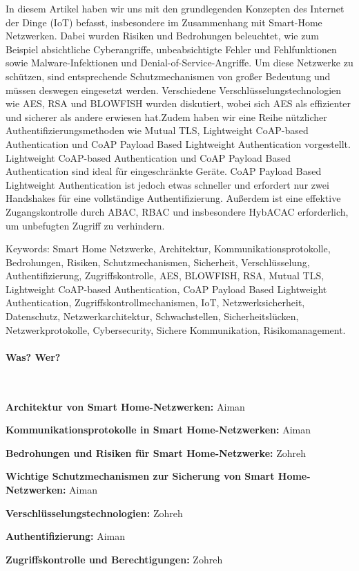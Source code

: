 In diesem Artikel haben wir uns mit den  grundlegenden Konzepten des Internet der Dinge (IoT) befasst, insbesondere im Zusammenhang mit Smart-Home Netzwerken.  Dabei wurden  Risiken und Bedrohungen beleuchtet, wie zum Beispiel absichtliche Cyberangriffe, unbeabsichtigte Fehler und Fehlfunktionen sowie Malware-Infektionen und Denial-of-Service-Angriffe. Um diese Netzwerke zu schützen, sind entsprechende  Schutzmechanismen von großer Bedeutung und müssen deswegen eingesetzt werden. Verschiedene Verschlüsselungstechnologien wie AES, RSA und BLOWFISH wurden diskutiert, wobei sich AES als effizienter und sicherer als andere erwiesen hat.Zudem haben wir eine Reihe nützlicher Authentifizierungsmethoden wie Mutual TLS, Lightweight CoAP-based Authentication und CoAP Payload Based Lightweight Authentication vorgestellt.  Lightweight CoAP-based Authentication und CoAP Payload Based Authentication sind ideal für eingeschränkte Geräte. CoAP Payload Based Lightweight Authentication ist jedoch etwas schneller und erfordert nur zwei Handshakes für eine vollständige Authentifizierung. Außerdem ist eine effektive Zugangskontrolle durch ABAC, RBAC und insbesondere HybACAC erforderlich, um unbefugten Zugriff zu verhindern.  

Keywords: 
Smart Home Netzwerke, Architektur, Kommunikationsprotokolle, Bedrohungen, Risiken, Schutzmechanismen, Sicherheit, Verschlüsselung, Authentifizierung, Zugriffskontrolle, AES, BLOWFISH, RSA, Mutual TLS, Lightweight CoAP-based Authentication, CoAP Payload Based Lightweight Authentication, Zugriffskontrollmechanismen, IoT, Netzwerksicherheit, Datenschutz, Netzwerkarchitektur, Schwachstellen, Sicherheitslücken, Netzwerkprotokolle, Cybersecurity, Sichere Kommunikation, Risikomanagement.


\newpage
\paragraph{Was? Wer?}\

\textbf{Architektur von Smart Home-Netzwerken:} Aiman

\textbf{Kommunikationsprotokolle in Smart Home-Netzwerken:} Aiman

\textbf{Bedrohungen und Risiken für Smart Home-Netzwerke:} Zohreh

\textbf{Wichtige Schutzmechanismen zur Sicherung von Smart Home-Netzwerken:} Aiman

\textbf{Verschlüsselungstechnologien:} Zohreh

\textbf{Authentifizierung:} Aiman

\textbf{Zugriffskontrolle und Berechtigungen:} Zohreh

\newpage
    \nocite{*}
    



